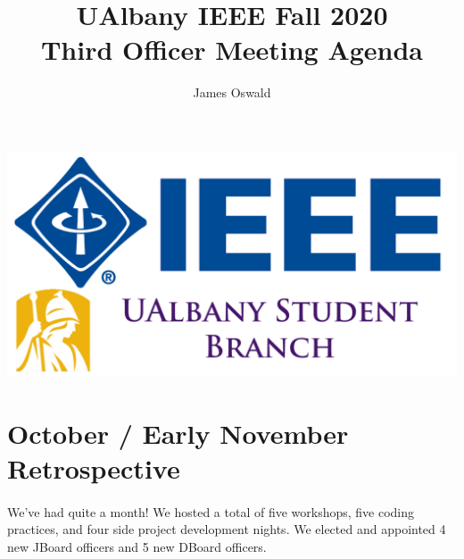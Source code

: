 \documentclass{article}
\author{James Oswald}
\title{UAlbany IEEE Fall 2020 \\ Third Officer Meeting Agenda}
\begin{document}
\maketitle
\thispagestyle{fancy}
\centering
\includegraphics[scale=0.2]{Officer Meeting Agendas/F20 Officer Meeting 2/Logo.png}
\tableofcontents
\newpage
\raggedright

\section{October / Early November Retrospective}
\paragraph{}

We've had quite a month! We hosted a total of five workshops, five coding practices, and four side project development nights. We elected and appointed 4 new JBoard officers and 5 new DBoard officers. 
\end{document}
